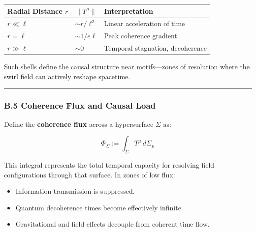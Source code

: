 \documentclass[
  11pt,
]{article}
\providecommand{\tightlist}{%
  \setlength{\itemsep}{0pt}\setlength{\parskip}{0pt}}
\begin{document}
\begin{longtable}[]{@{}
  >{\raggedright\arraybackslash}p{}
  >{\raggedright\arraybackslash}p{}
  >{\raggedright\arraybackslash}p{}@{}}
\toprule\noalign{}
\begin{minipage}[b]{\linewidth}\raggedright
Radial Distance \(r\)
\end{minipage} & \begin{minipage}[b]{\linewidth}\raggedright
\(\|T^\mu\|\)
\end{minipage} & \begin{minipage}[b]{\linewidth}\raggedright
Interpretation
\end{minipage} \\
\midrule\noalign{}
\endhead
\bottomrule\noalign{}
\endlastfoot
\(r \ll \ell\) & \(\sim r/\ell^2\) & Linear acceleration of time \\
\(r = \ell\) & \(\sim 1/e\ell\) & Peak coherence gradient \\
\(r \gg \ell\) & \(\sim 0\) & Temporal stagnation, decoherence \\
\end{longtable}

Such shells define the causal structure near motifs---zones of
resolution where the swirl field can actively reshape spacetime.

\begin{center}\rule{0.5\linewidth}{0.5pt}\end{center}

\subsubsection{\texorpdfstring{\textbf{B.5 Coherence Flux and Causal
Load}}{B.5 Coherence Flux and Causal Load}}\label{b.5-coherence-flux-and-causal-load}

Define the \textbf{coherence flux} across a hypersurface \(\Sigma\) as:

\[
\Phi_\Sigma := \int_\Sigma T^\mu \, d\Sigma_\mu
\]

This integral represents the total temporal capacity for resolving field
configurations through that surface. In zones of low flux:

\begin{itemize}
\tightlist
\item
  Information transmission is suppressed.
\item
  Quantum decoherence times become effectively infinite.
\item
  Gravitational and field effects decouple from coherent time flow.
\end{itemize}
\end{document}
